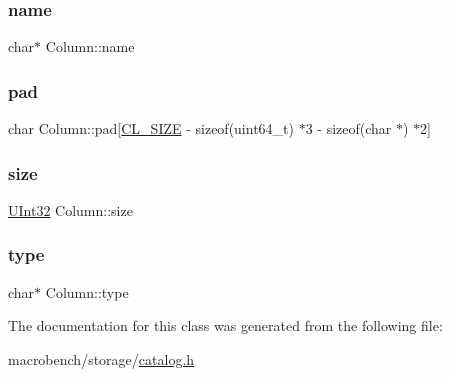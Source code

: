 \subsubsection{\texorpdfstring{name}{name}}
{\footnotesize\ttfamily char$\ast$ Column\+::name}

\mbox{\label{classColumn_ad463769a3fac16353aae885d74068683}} 
\subsubsection{\texorpdfstring{pad}{pad}}
{\footnotesize\ttfamily char Column\+::pad\mbox{[}\hyperlink{config_8h_aa18ff96566bf8c1f4cd38c1e7bc4ca80}{C\+L\+\_\+\+S\+I\+ZE} -\/ sizeof(uint64\+\_\+t) $\ast$3 -\/ sizeof(char $\ast$) $\ast$2\mbox{]}}

\mbox{\label{classColumn_a21899c8b3d8fcbc223756f2f333f53a7}} 
\subsubsection{\texorpdfstring{size}{size}}
{\footnotesize\ttfamily \hyperlink{global_8h_a7e8aeec7b6541935dfc6f608cd5170ce}{U\+Int32} Column\+::size}

\mbox{\label{classColumn_ac611ef0cc4f2814c13e04fa664806026}} 
\subsubsection{\texorpdfstring{type}{type}}
{\footnotesize\ttfamily char$\ast$ Column\+::type}



The documentation for this class was generated from the following file\+:\begin{DoxyCompactItemize}
\item 
macrobench/storage/\hyperlink{catalog_8h}{catalog.\+h}\end{DoxyCompactItemize}

